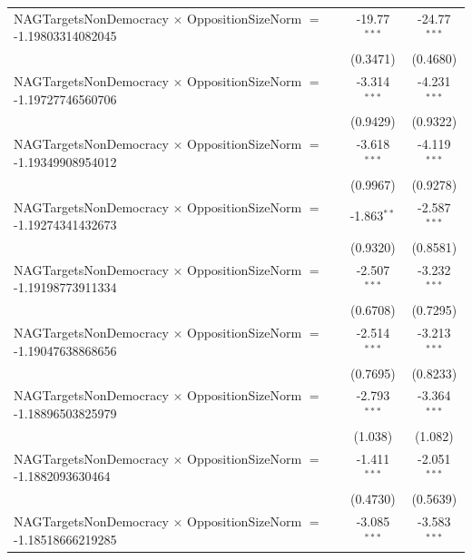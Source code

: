 \begin{tabular}{lcc}
   NAGTargetsNonDemocracy $\times$ OppositionSizeNorm $=$ -1.19803314082045     & -19.77$^{***}$       & -24.77$^{***}$\\   
                                                                                & (0.3471)             & (0.4680)\\   
   NAGTargetsNonDemocracy $\times$ OppositionSizeNorm $=$ -1.19727746560706     & -3.314$^{***}$       & -4.231$^{***}$\\   
                                                                                & (0.9429)             & (0.9322)\\   
   NAGTargetsNonDemocracy $\times$ OppositionSizeNorm $=$ -1.19349908954012     & -3.618$^{***}$       & -4.119$^{***}$\\   
                                                                                & (0.9967)             & (0.9278)\\   
   NAGTargetsNonDemocracy $\times$ OppositionSizeNorm $=$ -1.19274341432673     & -1.863$^{**}$        & -2.587$^{***}$\\   
                                                                                & (0.9320)             & (0.8581)\\   
   NAGTargetsNonDemocracy $\times$ OppositionSizeNorm $=$ -1.19198773911334     & -2.507$^{***}$       & -3.232$^{***}$\\   
                                                                                & (0.6708)             & (0.7295)\\   
   NAGTargetsNonDemocracy $\times$ OppositionSizeNorm $=$ -1.19047638868656     & -2.514$^{***}$       & -3.213$^{***}$\\   
                                                                                & (0.7695)             & (0.8233)\\   
   NAGTargetsNonDemocracy $\times$ OppositionSizeNorm $=$ -1.18896503825979     & -2.793$^{***}$       & -3.364$^{***}$\\   
                                                                                & (1.038)              & (1.082)\\   
   NAGTargetsNonDemocracy $\times$ OppositionSizeNorm $=$ -1.1882093630464      & -1.411$^{***}$       & -2.051$^{***}$\\   
                                                                                & (0.4730)             & (0.5639)\\   
   NAGTargetsNonDemocracy $\times$ OppositionSizeNorm $=$ -1.18518666219285     & -3.085$^{***}$       & -3.583$^{***}$\\   

\end{tabular}
